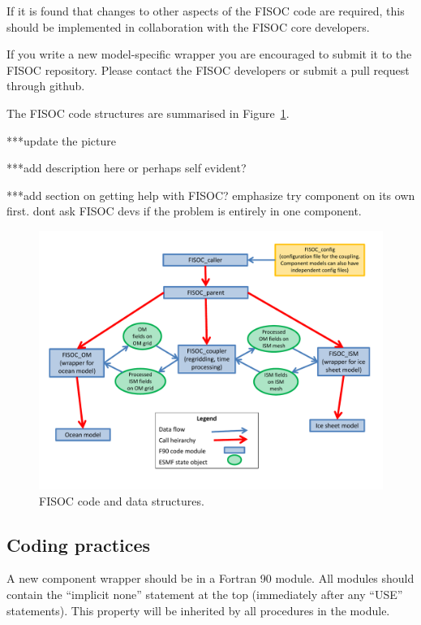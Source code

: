 \documentclass[12pt]{article}
\begin{document}
If it is found that changes to other aspects of the FISOC code are required, this should be 
implemented in collaboration with the FISOC core developers.

If you write a new model-specific wrapper you are encouraged to submit it to the FISOC repository.
Please contact the FISOC developers or submit a pull request through github.

The FISOC code structures are summarised in Figure~\ref{fig:codeStruct}.
 
***update the picture

***add description here or perhaps self evident?

***add section on getting help with FISOC? emphasize try component on its own first.  dont ask FISOC devs if the problem is entirely in one component.

\begin{figure}[t]
  \vspace*{2mm}
  \begin{center}
    \includegraphics[width=17cm]{FISOC_structure.pdf}
  \end{center}
  \caption{FISOC code and data structures.}
  \label{fig:codeStruct}
\end{figure}


\subsection{Coding practices}

A new component wrapper  should be in a Fortran 90 module.  
All modules should contain the ``implicit none'' statement at the top (immediately after any 
``USE'' statements).  This property will be inherited by all procedures in the module.
\end{document}
